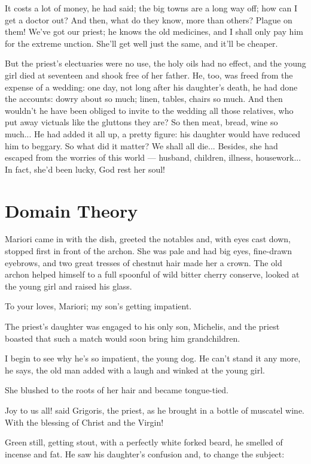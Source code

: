 \documentclass[diploma]{softlab-thesis}
\begin{document}
It costs a lot of money, he had said; the big towns are a long way off; how
can I get a doctor out? And then, what do they know, more than others?
Plague on them! We’ve got our priest; he knows the old medicines, and I
shall only pay him for the extreme unction. She’ll get well just the same,
and it’ll be cheaper.

But the priest’s electuaries were no use, the holy oils had no effect, and
the young girl died at seventeen and shook free of her father. He, too, was
freed from the expense of a wedding: one day, not long after his daughter’s
death, he had done the accounts: dowry about so much; linen, tables, chairs
so much. And then wouldn’t he have been obliged to invite to the wedding all
those relatives, who put away victuals like the gluttons they are? So then
meat, bread, wine so much... He had added it all up, a pretty figure: his
daughter would have reduced him to beggary. So what did it matter? We shall
all die... Besides, she had escaped from the worries of this world ---
husband, children, illness, housework... In fact, she’d been lucky, God rest
her soul!


\section{Domain Theory}

Mariori came in with the dish, greeted the notables and, with eyes cast
down, stopped first in front of the archon. She was pale and had big eyes,
fine-drawn eyebrows, and two great tresses of chestnut hair made her a
crown. The old archon helped himself to a full spoonful of wild bitter
cherry conserve, looked at the young girl and raised his glass.

To your loves, Mariori; my son’s getting impatient.

The priest’s daughter was engaged to his only son, Michelis, and the priest
boasted that such a match would soon bring him grandchildren.

I begin to see why he’s so impatient, the young dog. He can’t stand it any
more, he says, the old man added with a laugh and winked at the young girl.

She blushed to the roots of her hair and became tongue-tied.

Joy to us all! said Grigoris, the priest, as he brought in a bottle of
muscatel wine. With the blessing of Christ and the Virgin!

Green still, getting stout, with a perfectly white forked beard, he smelled
of incense and fat. He saw his daughter’s confusion and, to change the
subject:
\end{document}
